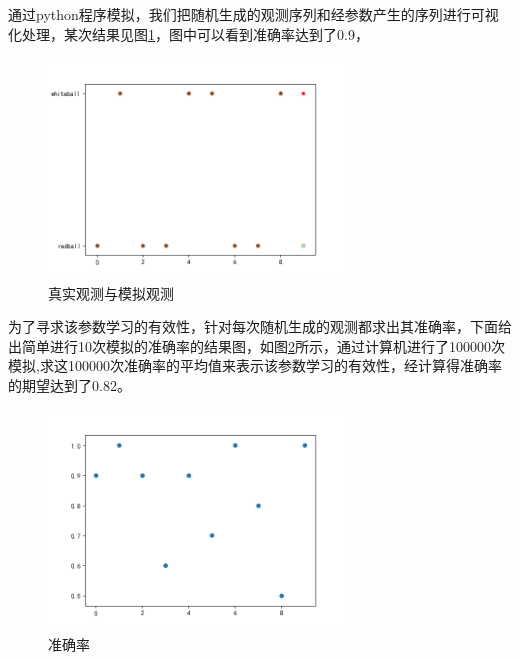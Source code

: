 \documentclass[a4paper,12pt]{ctexart}     %
\begin{document}
通过python程序模拟，我们把随机生成的观测序列和经参数产生的序列进行可视化处理，某次结果见图\ref{fig:acc}，图中可以看到准确率达到了0.9，
\begin{figure}[H] %
	\centering %
	\includegraphics[width=0.7\textwidth]{Figure_1.png} %
	\caption{真实观测与模拟观测 \label{fig:acc}} %
\end{figure}

为了寻求该参数学习的有效性，针对每次随机生成的观测都求出其准确率，下面给出简单进行10次模拟的准确率的结果图，如图\ref{fig:accuracy}所示，通过计算机进行了100000次模拟,求这100000次准确率的平均值来表示该参数学习的有效性，经计算得准确率的期望达到了0.82。
\begin{figure}[H] %
	\centering %
	\includegraphics[width=0.7\textwidth]{accuracy_1.png} %
	\caption{准确率 \label{fig:accuracy}} %
\end{figure}


\end{document}
